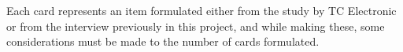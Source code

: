 Each card represents an item formulated either from the study by TC Electronic or from the interview previously in this project, and while making these, some considerations must be made to the number of cards formulated. 







































